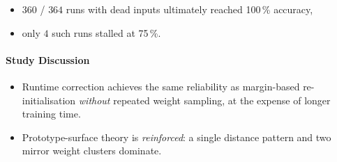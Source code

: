 \begin{itemize}
  \item $360$ / $364$ runs with dead inputs ultimately reached
        100\,\% accuracy,
  \item only $4$ such runs stalled at 75\,\%.
\end{itemize}

\paragraph{Study Discussion}
\begin{itemize}
  \item Runtime correction achieves the same reliability as
        margin-based re-initialisation \emph{without} repeated weight
        sampling, at the expense of longer training time.
  \item Prototype-surface theory is \emph{reinforced}: a single distance
        pattern and two mirror weight clusters dominate.
\end{itemize}

\hrulefill
